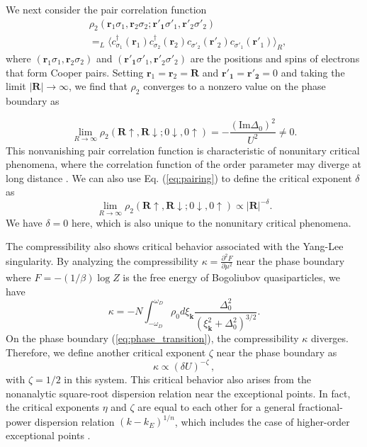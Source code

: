 \documentclass[aps,prl,twocolumn,superscriptaddress]{revtex4-1}
\begin{document}
\begin{bibunit}[apsrev4-2]
We next consider the pair correlation function 
\begin{align}
 & \rho_{2}(\bm{r}_{1}\sigma_{1},\bm{r}_{2}\sigma_{2};\bm{r'_{1}}\sigma'_{1},\bm{r'}_{2}\sigma'_{2})\nonumber \\
 & =_{L}\langle c_{\sigma_{1}}^{\dagger}(\bm{r}_{1})c_{\sigma_{2}}^{\dagger}(\bm{r}_{2})c_{\sigma'_{2}}(\bm{r'}_{2})c_{\sigma'_{1}}(\bm{r'}_{1})\rangle_{R},
\end{align}
where $(\bm{r}_{1}\sigma_{1},\bm{r}_{2}\sigma_{2})$ and $(\bm{r'_{1}}\sigma'_{1},\bm{r'}_{2}\sigma'_{2})$
are the positions and spins of electrons that form Cooper pairs.
Setting $\bm{r}_{1}=\bm{r}_{2}=\bm{R}$ and $\bm{r'_{1}}=\bm{r'_2}=0$
and taking the limit $|\bm{R}|\rightarrow\infty$, we find that $\rho_{2}$ converges to a nonzero value
on the phase boundary as

\begin{equation}
\lim_{R\rightarrow\infty}\rho_{2}(\bm{R}\uparrow,\bm{R}\downarrow;0\downarrow,0\uparrow)=-\frac{(\text{Im}\Delta_0)^{2}}{U^{2}}\neq0.\label{eq:pairing}
\end{equation}
This nonvanishing pair correlation function is characteristic of
nonunitary critical phenomena, where the correlation function of the
order parameter may diverge at long distance \cite{Fisher:1978vn}.
We can also use Eq. (\ref{eq:pairing}) to define the critical
exponent $\delta$ as 
\begin{equation}
\lim_{R\rightarrow\infty}\rho_{2}(\bm{R}\uparrow,\bm{R}\downarrow;0\downarrow,0\uparrow)\propto|\bm{R}|^{-\delta}.
\end{equation}
We have $\delta=0$ here, which is also unique to the nonunitary critical
phenomena.

The compressibility also shows critical behavior associated with the Yang-Lee singularity.
By analyzing the compressibility $\kappa=\frac{\partial^{2}F}{\partial\mu^{2}}$
near the phase boundary where $F=-(1/\beta)\log Z$ is the free energy
of Bogoliubov quasiparticles, we have 
\begin{equation}
\kappa=-N\int_{-\omega_{D}}^{\omega_{D}}\rho_{0}d\xi_{\bm{k}}\frac{\Delta_0^{2}}{(\xi_{\bm{k}}^{2}+\Delta_0^{2})^{3/2}}.
\end{equation}
On the phase boundary (\ref{eq:phase_transition}), the compressibility
$\kappa$ diverges. Therefore, we define another critical exponent
$\zeta$ near the phase boundary as 
\begin{equation}
\kappa\propto(\delta U)^{-\zeta}\,,
\end{equation}
with $\zeta=1/2$ in this system. This critical behavior also arises
from the nonanalytic square-root dispersion relation near the exceptional
points. In fact, the critical exponents $\eta$ and $\zeta$ are equal to each other 
for a general fractional-power dispersion relation $(k-k_{E})^{1/n}$,
which includes the case of higher-order exceptional points \cite{SupplementaryMaterial}. 


\end{bibunit}
\end{document}
